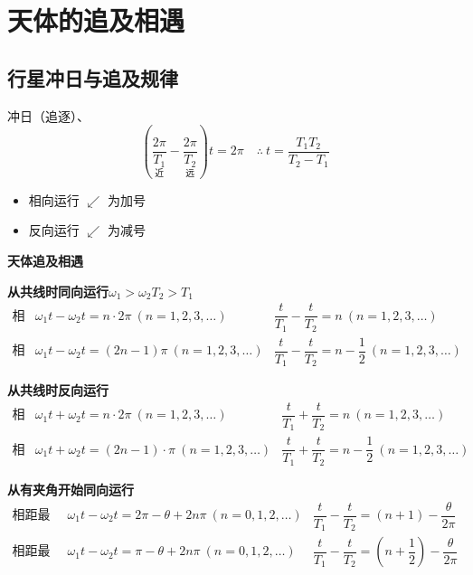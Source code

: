 \section{天体的追及相遇}
\subsection{行星冲日与追及规律}
冲日（追逐）、
\[ \left(\underset{\text{近}}{\frac{2\pi}{T_1}}-\underset{\text{远}}{\frac{2\pi}{T_2}}\right)t=2\pi\quad\therefore\ t=\frac{T_1T_2}{T_2-T_1} \]

\begin{itemize}
\item 相向运行 $\swarrow$ 为加号 %
\item 反向运行 $\swarrow$ 为减号 %
\end{itemize}

\textbf{天体追及相遇}

\textbf{从共线时同向运行}\quad $\omega_1>\omega_2$\quad $T_2>T_1$
\[
\begin{array}{lll}
\text{相距最近} & \omega_1t-\omega_2t=n\cdot2\pi\ (n=1,2,3,\ldots) & \dfrac{t}{T_1}-\dfrac{t}{T_2}=n\ (n=1,2,3,\ldots)\\[10pt]
\text{相距最远} & \omega_1t-\omega_2t=(2n-1)\pi\ (n=1,2,3,\ldots) & \dfrac{t}{T_1}-\dfrac{t}{T_2}=n-\dfrac{1}{2}\ (n=1,2,3,\ldots)
\end{array}
\]

\textbf{从共线时反向运行}
\[
\begin{array}{lll}
\text{相距最近} & \omega_1t+\omega_2t=n\cdot2\pi\ (n=1,2,3,\ldots) & \dfrac{t}{T_1}+\dfrac{t}{T_2}=n\ (n=1,2,3,\ldots)\\[10pt]
\text{相距最远} & \omega_1t+\omega_2t=(2n-1)\cdot\pi\ (n=1,2,3,\ldots) & \dfrac{t}{T_1}+\dfrac{t}{T_2}=n-\dfrac{1}{2}\ (n=1,2,3,\ldots)
\end{array}
\]

\textbf{从有夹角开始同向运行}
\[
\begin{array}{lll}
\text{相距最近} & \omega_1t-\omega_2t=2\pi-\theta+2n\pi\ (n=0,1,2,\ldots) & \dfrac{t}{T_1}-\dfrac{t}{T_2}=(n+1)-\dfrac{\theta}{2\pi}\\[10pt]
\text{相距最远} & \omega_1t-\omega_2t=\pi-\theta+2n\pi\ (n=0,1,2,\ldots) & \dfrac{t}{T_1}-\dfrac{t}{T_2}=\left(n+\dfrac{1}{2}\right)-\dfrac{\theta}{2\pi}
\end{array}
\]

